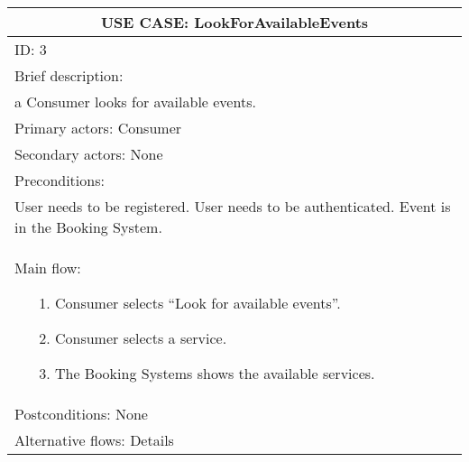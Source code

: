 \documentclass{article}
\begin{document}
\begin{table}[h!]
	\centering
	\begin{tabular}{|p{10cm}|}
		\hline
		\multicolumn{1}{|c|}{\textbf{USE CASE: LookForAvailableEvents}}\\
		\hline
		ID: 3\\
		\hline
		Brief description:\\a Consumer looks for available events.\\
		\hline
		Primary actors: Consumer \\
		\hline
		Secondary actors: None \\
		\hline
		Preconditions:\\User needs to be registered. User needs to be authenticated. Event is in the Booking System.\\
		\hline
		Main flow:
		\vspace{-0.5\baselineskip}
		\begin{itemize}[leftmargin=1.2em]
			\item[1.] Consumer selects “Look for available events”.
			\vspace{-0.5\baselineskip}
			\item[2.] Consumer selects a service.
			\vspace{-0.5\baselineskip}
			\item[3.] The Booking Systems shows the available services.
		\end{itemize}
		\vspace{-1.5\baselineskip}
		\\
		\hline
		Postconditions: None \\
		\hline
		Alternative flows: Details \\
		\hline
	\end{tabular}
\end{table}
\end{document}

